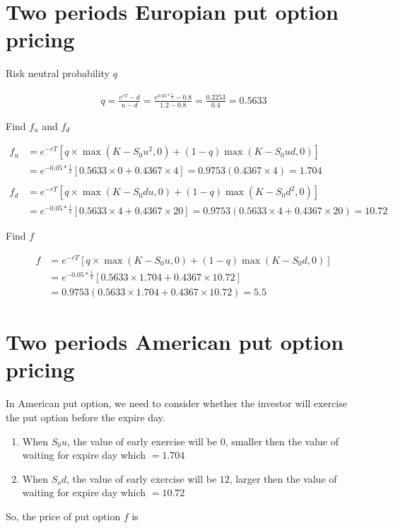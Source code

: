 \documentclass[12pt]{article}
\begin{document}
 

\rhead{\today}
 
\section{Two periods Europian put option pricing}
Risk neutral probability $q$

\begin{align*}
    q = \frac{e^{rT}-d}{u-d} = \frac{e^{0.05*\frac{1}{2}}-0.8}{1.2-0.8} = \frac{0.2253}{0.4} = 0.5633
\end{align*}

Find $f_u$ and $f_d$

\begin{align*} 
    f_u &= e^{-rT}[q\times \max(K-S_{0}u^2, 0)+(1-q)\max(K-S_0 ud, 0)]\\
    &= e^{-0.05*\frac{1}{2}}[0.5633\times 0+0.4367\times 4] = 0.9753(0.4367\times 4)=1.704 \\\\
    f_d &= e^{-rT}[q\times \max(K-S_{0}du, 0)+(1-q)\max(K-S_0 d^2, 0)]\\
    &= e^{-0.05*\frac{1}{2}}[0.5633\times 4+0.4367\times 20] = 0.9753(0.5633\times 4 + 0.4367 \times 20)=10.72
\end{align*}

Find $f$

\begin{align*}
    f &= e^{-rT}[q\times \max(K-S_{0}u, 0)+(1-q)\max(K-S_0 d, 0)]\\
    &= e^{-0.05*\frac{1}{2}}[0.5633\times 1.704+0.4367\times 10.72]\\
    &= 0.9753(0.5633\times 1.704 + 0.4367 \times 10.72)=5.5
\end{align*}


\section{Two periods American put option pricing}
In American put option, we need to consider whether the investor will exercise the put option before the expire day.
\begin{enumerate}
    \item When $S_0 u$, the value of early exercise will be $0$, smaller then the value of waiting for expire day which $ = 1.704$
    \item When $S_o d$, the value of early exercise will be $12$, larger then the value of waiting for expire day which $ = 10.72$
\end{enumerate}
So, the price of put option $f$ is
\end{document}
